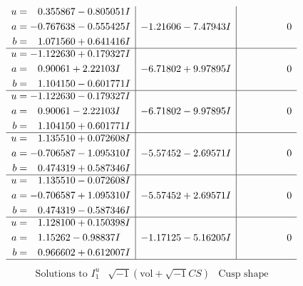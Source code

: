 \documentclass[1p]{elsarticle_modified}
\theoremstyle{definition}
\newcommand{\I}{\sqrt{-1}}
\begin{document}
$$\begin{array}{c|c|c}
\begin{aligned}
u &= \phantom{-}0.355867 - 0.805051 I \\
a &= -0.767638 - 0.555425 I \\
b &= \phantom{-}1.071560 + 0.641416 I\end{aligned}
 & -1.21606 - 7.47943 I & \phantom{-0.000000 } 0 \\ \hline\begin{aligned}
u &= -1.122630 + 0.179327 I \\
a &= \phantom{-}0.90061 + 2.22103 I \\
b &= \phantom{-}1.104150 - 0.601771 I\end{aligned}
 & -6.71802 + 9.97895 I & \phantom{-0.000000 } 0 \\ \hline\begin{aligned}
u &= -1.122630 - 0.179327 I \\
a &= \phantom{-}0.90061 - 2.22103 I \\
b &= \phantom{-}1.104150 + 0.601771 I\end{aligned}
 & -6.71802 - 9.97895 I & \phantom{-0.000000 } 0 \\ \hline\begin{aligned}
u &= \phantom{-}1.135510 + 0.072608 I \\
a &= -0.706587 - 1.095310 I \\
b &= \phantom{-}0.474319 + 0.587346 I\end{aligned}
 & -5.57452 - 2.69571 I & \phantom{-0.000000 } 0 \\ \hline\begin{aligned}
u &= \phantom{-}1.135510 - 0.072608 I \\
a &= -0.706587 + 1.095310 I \\
b &= \phantom{-}0.474319 - 0.587346 I\end{aligned}
 & -5.57452 + 2.69571 I & \phantom{-0.000000 } 0 \\ \hline\begin{aligned}
u &= \phantom{-}1.128100 + 0.150398 I \\
a &= \phantom{-}1.15262 - 0.98837 I \\
b &= \phantom{-}0.966602 + 0.612007 I\end{aligned}
 & -1.17125 - 5.16205 I & \phantom{-0.000000 } 0\\
 \hline 
 \end{array}$$\newpage$$\begin{array}{c|c|c}  
\text{Solutions to }I^u_{1}& \I (\text{vol} + \sqrt{-1}CS) & \text{Cusp shape}\\
 \hline 
\begin{aligned}

\end{aligned}
\end{array}$$
\end{document}

